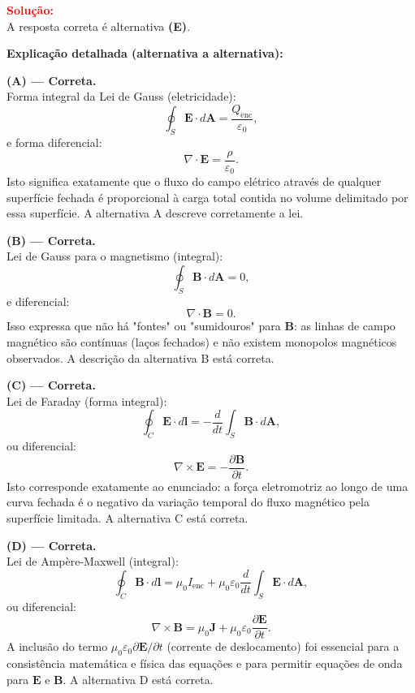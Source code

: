 \documentclass[a4paper,12pt]{article}
\begin{document}
\begin{flushleft}
\vspace{0.5cm}

\textcolor{red}{\textbf{Solução:}}\\

A resposta correta é alternativa \colorbox{green!50}{\textbf{(E)}}.

\bigskip

\textbf{Explicação detalhada (alternativa a alternativa):}

\medskip

\textbf{(A) --- Correta.}\\
Forma integral da Lei de Gauss (eletricidade):
\[
\oint_{S} \mathbf{E}\cdot d\mathbf{A}=\frac{Q_{\text{enc}}}{\varepsilon_0},
\]
e forma diferencial:
\[
\nabla\cdot\mathbf{E}=\frac{\rho}{\varepsilon_0}.
\]
Isto significa exatamente que o fluxo do campo elétrico através de qualquer superfície fechada é proporcional à carga total contida no volume delimitado por essa superfície. A alternativa A descreve corretamente a lei.

\medskip

\textbf{(B) --- Correta.}\\
Lei de Gauss para o magnetismo (integral):
\[
\oint_{S}\mathbf{B}\cdot d\mathbf{A}=0,
\]
e diferencial:
\[
\nabla\cdot\mathbf{B}=0.
\]
Isso expressa que não há "fontes" ou "sumidouros" para \(\mathbf{B}\): as linhas de campo magnético são contínuas (laços fechados) e não existem monopolos magnéticos observados. A descrição da alternativa B está correta.

\medskip

\textbf{(C) --- Correta.}\\
Lei de Faraday (forma integral):
\[
\oint_{C}\mathbf{E}\cdot d\mathbf{l}=-\frac{d}{dt}\int_{S}\mathbf{B}\cdot d\mathbf{A},
\]
ou diferencial:
\[
\nabla\times\mathbf{E}=-\frac{\partial\mathbf{B}}{\partial t}.
\]
Isto corresponde exatamente ao enunciado: a força eletromotriz ao longo de uma curva fechada é o negativo da variação temporal do fluxo magnético pela superfície limitada. A alternativa C está correta.

\medskip

\textbf{(D) --- Correta.}\\
Lei de Ampère-Maxwell (integral):
\[
\oint_{C}\mathbf{B}\cdot d\mathbf{l}=\mu_0 I_{\text{enc}}+\mu_0\varepsilon_0\frac{d}{dt}\int_{S}\mathbf{E}\cdot d\mathbf{A},
\]
ou diferencial:
\[
\nabla\times\mathbf{B}=\mu_0\mathbf{J}+\mu_0\varepsilon_0\frac{\partial\mathbf{E}}{\partial t}.
\]
A inclusão do termo \(\mu_0\varepsilon_0\partial\mathbf{E}/\partial t\) (corrente de deslocamento) foi essencial para a consistência matemática e física das equações e para permitir equações de onda para \(\mathbf{E}\) e \(\mathbf{B}\). A alternativa D está correta.


\end{flushleft}
\end{document}
